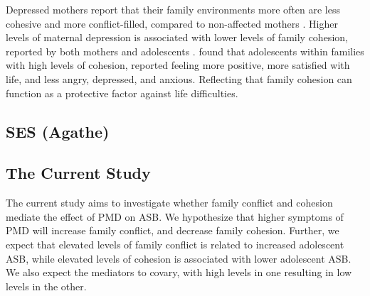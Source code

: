 Depressed mothers report that their family environments more often are less cohesive and more conflict-filled, compared to non-affected mothers \parencite{slee:1996}. Higher levels of maternal depression is associated with lower levels of family cohesion, reported by both mothers and adolescents \parencite{perez:2018}. \textcite{fosco:2020} found that adolescents within families with high levels of cohesion, reported feeling more positive, more satisfied with life, and less angry, depressed, and anxious. Reflecting that family cohesion can function as a protective factor against life difficulties.

\subsection{SES (Agathe)}

\subsection{The Current Study}

The current study aims to investigate whether family conflict and cohesion mediate the effect of PMD on ASB. We hypothesize that higher symptoms of PMD will increase family conflict, and decrease family cohesion. Further, we expect that elevated levels of family conflict is related to increased adolescent ASB, while elevated levels of cohesion is associated with lower adolescent ASB. We also expect the mediators to covary, with high levels in one resulting in low levels in the other.
